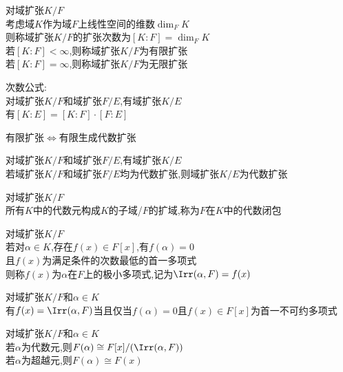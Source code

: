 \begin{dingyi}
对域扩张$K/F$\\
考虑域$K$作为域$F$上线性空间的维数$\dim_{F}K$\\
则称域扩张$K/F$的扩张次数为$[K:F]=\dim_{F}K$\\
若$[K:F]<\infty$,则称域扩张$K/F$为有限扩张\\
若$[K:F]=\infty$,则称域扩张$K/F$为无限扩张
\end{dingyi}

\begin{dingli}
次数公式:\\
对域扩张$K/F$和域扩张$F/E$,有域扩张$K/E$\\
有$[K:E]=[K:F]\cdot[F:E]$
\end{dingli}

\begin{dingli}
有限扩张$\Leftrightarrow$有限生成代数扩张
\end{dingli}

\begin{dingli}
对域扩张$K/F$和域扩张$F/E$,有域扩张$K/E$\\
若域扩张$K/F$和域扩张$F/E$均为代数扩张,则域扩张$K/E$为代数扩张
\end{dingli}

\begin{dingli}
对域扩张$K/F$\\
所有$K$中的代数元构成$K$的子域/$F$的扩域,称为$F$在$K$中的代数闭包
\end{dingli}

\begin{dingyi}
对域扩张$K/F$\\
若对$\alpha\in K$,存在$f(x)\in F[x]$,有$f(\alpha)=0$\\
且$f(x)$为满足条件的次数最低的首一多项式\\
则称$f(x)$为$\alpha$在$F$上的极小多项式,记为$\Irr(\alpha,F)=f(x)$
\end{dingyi}

\begin{dingli}
对域扩张$K/F$和$\alpha \in K$\\
有$f(x)=\Irr (\alpha,F)$当且仅当$f(\alpha)=0$且$f(x)\in F[x]$为首一不可约多项式
\end{dingli}

\begin{dingli}
对域扩张$K/F$和$\alpha \in K$\\
若$\alpha$为代数元,则$F(\alpha)\cong F[x]/(\Irr(\alpha,F))$\\
若$\alpha$为超越元,则$F(\alpha)\cong F(x)$
\end{dingli}

